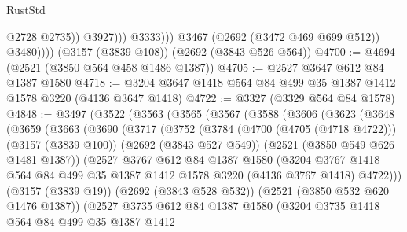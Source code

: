 \begin{lexlean}{RustStd}
\begin{coremodule}
{\begin{coremodule}
{{{{{{{{{{                            @2728
                            @2735))
                        @3927)))
                  @3333)))
            @3467
            (@2692 (@3472 @469 @699 @512))
            @3480))))
    (@3157 (@3839 @108))
    (@2692 (@3843 @526 @564))
@4700 := @4694 (@2521 (@3850 @564 @458 @1486 @1387))
@4705 := @2527 @3647 @612 @84 @1387 @1580
@4718 := @3204 @3647 @1418 @564 @84 @499 @35 @1387 @1412 @1578 @3220 (@4136 @3647 @1418)
@4722 := @3327 (@3329 @564 @84 @1578)
@4848 := @3497
    (@3522
      (@3563
        (@3565
          (@3567
            (@3588
              (@3606
                (@3623
                  (@3648
                    (@3659
                      (@3663
                        (@3690
                          (@3717
                            (@3752
                              (@3784
                                (@4700 (@4705 (@4718 @4722)))
                                (@3157 (@3839 @100))
                                (@2692 (@3843 @527 @549))
                                (@2521 (@3850 @549 @626 @1481 @1387))
                                (@2527
                                  @3767
                                  @612
                                  @84
                                  @1387
                                  @1580
                                  (@3204
                                    @3767
                                    @1418
                                    @564
                                    @84
                                    @499
                                    @35
                                    @1387
                                    @1412
                                    @1578
                                    @3220
                                    (@4136 @3767 @1418)
                                    @4722)))
                              (@3157 (@3839 @19))
                              (@2692 (@3843 @528 @532))
                              (@2521 (@3850 @532 @620 @1476 @1387))
                              (@2527
                                @3735
                                @612
                                @84
                                @1387
                                @1580
                                (@3204
                                  @3735
                                  @1418
                                  @564
                                  @84
                                  @499
                                  @35
                                  @1387
                                  @1412
}}}}}}}}}}
\end{coremodule}}
\end{coremodule}
\end{lexlean}
